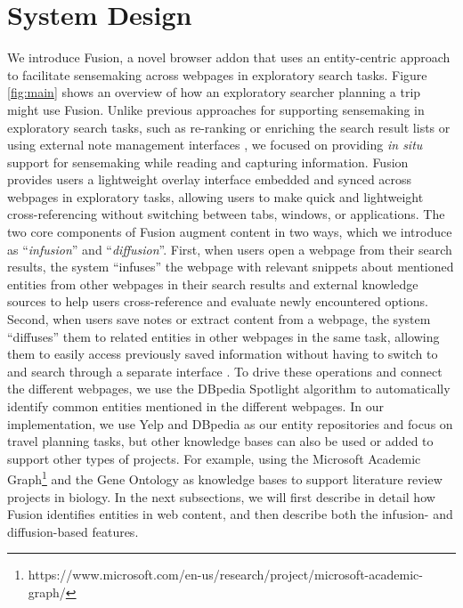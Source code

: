 \section{System Design}
We introduce Fusion, a novel browser addon that uses an entity-centric approach to facilitate sensemaking across webpages in exploratory search tasks. Figure \ref{fig:main} shows an overview of how an exploratory searcher planning a trip might use Fusion. Unlike previous approaches for supporting sensemaking in exploratory search tasks, such as re-ranking or enriching the search result lists or using external note management interfaces \cite{syed2017optimizing,miliaraki2015selena}, we focused on providing \emph{in situ} support for sensemaking while reading and capturing information.  Fusion provides users a lightweight overlay interface embedded and synced across webpages in exploratory tasks, allowing users to make quick and lightweight cross-referencing without switching between tabs, windows, or applications. The two core components of Fusion augment content in two ways, which we introduce as ``\emph{infusion}'' and ``\emph{diffusion}''. First, when users open a webpage from their search results, the system ``infuses'' the webpage with relevant snippets about mentioned entities from other webpages in their search results and external knowledge sources to help users cross-reference and evaluate newly encountered options. Second, when users save notes or extract content from a webpage, the system ``diffuses'' them to related entities in other webpages in the same task, allowing them to easily access previously saved information without having to switch to and search through a separate interface \cite{notetoself}. To drive these operations and connect the different webpages, we use the DBpedia Spotlight algorithm \cite{spotlight} to automatically identify common entities mentioned in the different webpages. In our implementation, we use Yelp and DBpedia as our entity repositories and focus on travel planning tasks, but other knowledge bases can also be used or added to support other types of projects. For example, using the Microsoft Academic Graph\footnote{https://www.microsoft.com/en-us/research/project/microsoft-academic-graph/} and the Gene Ontology \cite{gene} as knowledge bases to support literature review projects in biology. In the next subsections, we will first describe in detail how Fusion identifies entities in web content, and then describe both the infusion- and diffusion-based features.

